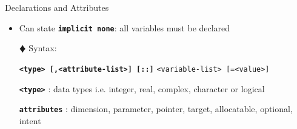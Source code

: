 \documentclass[slidestop,mathserif,compress,xcolor=svgnames]{beamer}
\newenvironment{bblock}[0]
{
\begin{beamerboxesrounded}[upper=uppercol1,lower=lowercol1,shadow=true]}
{\end{beamerboxesrounded}}
\begin{document}
\begin{frame}[allowframebreaks]
  \framebreak
  \begin{block}{\scriptsize Declarations and Attributes}
    \begin{itemize}
      \item Can state \textbf{\texttt{implicit none}}: all variables must be declared
      \item[$\vardiamond$] Syntax:
      \item[] \textbf{\texttt{<type> [,<attribute-list>] [::]}} \texttt{<variable-list> [=<value>]}
      \item[] \textbf{\texttt{<type>}} : data types i.e. integer, real, complex, character or logical
      \item[] \textbf{\texttt{attributes}} : dimension, parameter, pointer, target, allocatable, optional, intent

\end{itemize}
\end{block}
\end{frame}
\end{document}
